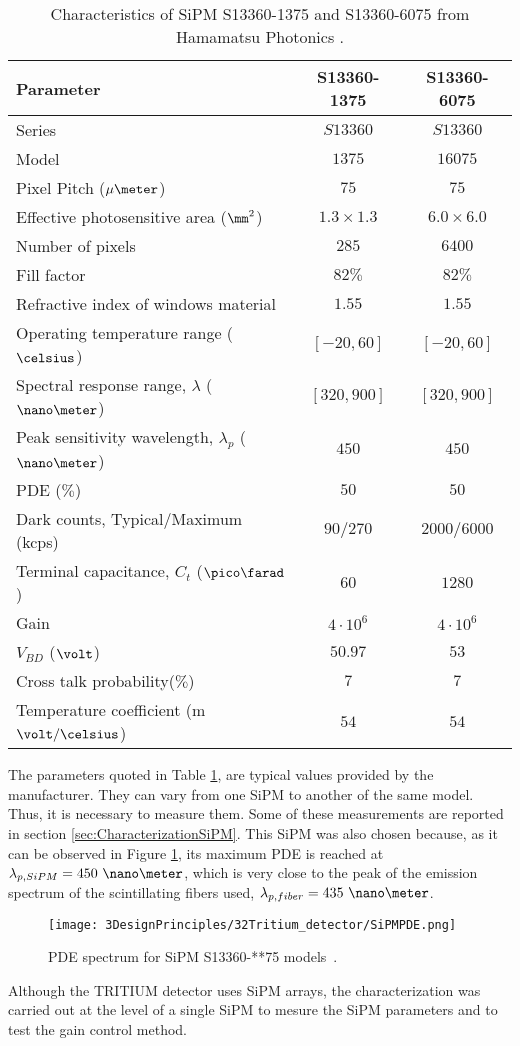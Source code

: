 \begin{table}[htbp]
\centering{}%
\begin{tabular}{lcc}
\toprule 
Parameter & S13360-1375 & S13360-6075 \tabularnewline
\midrule
\midrule 
Series & $S13360$ & $S13360$ \tabularnewline
Model & $1375$ & $16075$ \tabularnewline
Pixel Pitch ($\mu\meter$) & $75$ & $75$ \tabularnewline
Effective photosensitive area ($\mm^2$) & $1.3 \times 1.3$ & $6.0 \times 6.0$ \tabularnewline
Number of pixels & $285$ & $6400$ \tabularnewline
Fill factor & $82\%$ & $82\%$ \tabularnewline
Refractive index of windows material & $1.55$ & $1.55$ \tabularnewline
Operating temperature range ($\celsius$) & $[-20,60]$ & $[-20,60]$ \tabularnewline
Spectral response range, $\lambda$ ($\nano\meter$) & $[320, 900]$ & $[320, 900]$ \tabularnewline
Peak sensitivity wavelength, $\lambda_p$ ($\nano\meter$) & $450$ & $450$ \tabularnewline
PDE ($\%$) & $50$ & $50$ \tabularnewline
Dark counts, Typical/Maximum (kcps) & $90/270$ & $2000/6000$ \tabularnewline
Terminal capacitance, $C_t$ ($\pico\farad$) & $60$ & $1280$ \tabularnewline
Gain & $4 \cdot{} 10^6$ & $4 \cdot{} 10^6$ \tabularnewline
$V_{BD}$ ($\volt$) & $50.97$ & $53$ \tabularnewline
Cross talk probability($\%$) & $7$ & $7$ \tabularnewline
Temperature coefficient (m$\volt/\celsius$) & $54$ & $54$ \tabularnewline
\bottomrule
\end{tabular}
\caption{Characteristics of SiPM S13360-1375 and S13360-6075 from Hamamatsu Photonics \cite{DataSheetHammamatsu_1_SiPM_1375}.}
\label{tab:PropertiesOfSiPM1375}
\end{table}

The parameters quoted in Table \ref{tab:PropertiesOfSiPM1375}, are typical values provided by the manufacturer. They can vary from one SiPM to another of the same model. Thus, it is necessary to measure them. Some of these measurements are reported in section \ref{sec:CharacterizationSiPM}.  This SiPM was also chosen because, as it can be observed in Figure \ref{fig:PDESiPM}, its maximum PDE is reached at $\lambda_{p,SiPM}=450~\nano\meter$, which is very close to the peak of the emission spectrum of the scintillating fibers used, $\lambda_{p,fiber}=435~\nano\meter$.

\begin{figure}[htbp]
\centering
\texttt{[image: 3DesignPrinciples/32Tritium\_detector/SiPMPDE.png]}
\caption{PDE spectrum for SiPM S13360-**75 models~\cite{DataSheetHammamatsu_1_SiPM_1375}.\label{fig:PDESiPM}}
\end{figure}

Although the TRITIUM detector uses SiPM arrays, the characterization was carried out at the level of a single SiPM to mesure the SiPM parameters and to test the gain control method. %